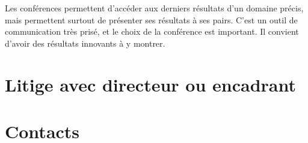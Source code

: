 \documentclass[a5paper]{article}
\begin{document}
Les conférences permettent d'accéder aux derniers résultats d'un domaine précis, mais permettent surtout de présenter ses résultats à ses pairs. C'est un outil de communication très prisé, et le choix de la conférence est important. Il convient d'avoir des résultats innovants à y montrer.

\section{Litige avec directeur ou encadrant}
\label{sec:litige}

\appendix

\section{Contacts}
\label{sec:contacts}
\end{document}
